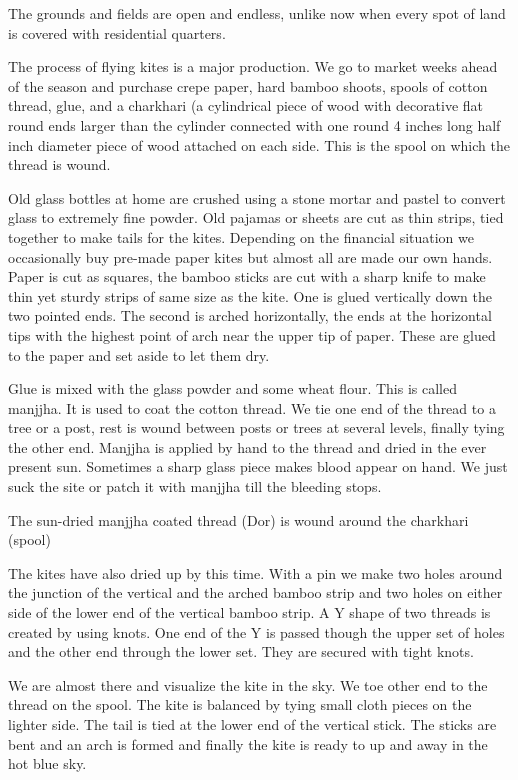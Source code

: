 The grounds and fields are open and endless, unlike now when every spot of
land is covered with residential quarters. 

The process of flying kites is a major production. We go to market weeks
ahead of the season and purchase crepe paper, hard bamboo shoots, spools
of cotton thread, glue, and a charkhari (a cylindrical piece of wood with
decorative flat round ends larger than the cylinder connected with one
round 4 inches long half inch diameter piece of wood attached on each
side. This is the spool on which the thread is wound.  

Old glass bottles at home are crushed using a stone mortar and pastel to
convert glass to extremely fine powder. Old pajamas or sheets are cut as
thin strips, tied together to make tails for the kites. Depending on the
financial situation we occasionally buy pre-made paper kites but almost
all are made our own hands. Paper is cut as squares, the bamboo sticks are
cut with a sharp knife to make thin yet sturdy strips of same size as the
kite. One is glued vertically down the two pointed ends. The second is
arched horizontally, the ends at the horizontal tips with the highest
point of arch near the upper tip of paper. These are glued to the paper
and set aside to let them dry. 

Glue is mixed with the glass powder and some wheat flour. This is called
manjjha. It is used to coat the cotton thread. We tie one end of the
thread to a tree or a post, rest is wound between posts or trees at
several levels, finally tying the other end.  Manjjha is applied by hand
to the thread and dried in the ever present sun. Sometimes a sharp glass
piece makes blood appear on hand. We just suck the site or patch it with
manjjha till the bleeding stops. 

The sun-dried manjjha coated thread (Dor) is wound around the charkhari
(spool)

The kites have also dried up by this time. With a pin we make two holes
around the junction of the vertical and the arched bamboo strip and two
holes on either side of the lower end of the vertical bamboo strip.
A Y shape of two threads is created by using knots. One end of the Y is
passed though the upper set of holes and  the other end through the lower
set. They are secured with tight knots. 

We are almost there and visualize the kite in the sky. We toe other end to
the thread on the spool. The kite is balanced by tying small cloth pieces
on the lighter side. The tail is tied at the lower end of the vertical
stick. The sticks are bent and an arch is formed and finally the kite is
ready to up and away in the hot blue sky. 

